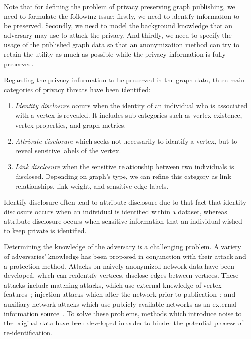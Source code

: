 Note that for defining the problem of privacy preserving graph publishing, we need to formulate the following issue: firstly, we need to identify information to be preserved. Secondly, we need to model the background knowledge that an adversary may use to attack the privacy. And thirdly, we need to specify the usage of the published graph data so that an anonymization method can try to retain the utility as much as possible while the privacy information is fully preserved. 

Regarding the privacy information to be preserved in the graph data, three main categories of privacy threats have been identified: 
\begin{enumerate}
    \item {\em Identity disclosure} occurs when the identity of an individual who is associated with a vertex is revealed. It includes sub-categories such as vertex existence, vertex properties, and graph metrics. 
    \item {\em Attribute disclosure} which seeks not necessarily to identify a vertex, but to reveal sensitive labels of the vertex. 
    \item {\em Link disclosure} when the sensitive relationship between two individuals is disclosed. Depending on graph's type, we can refine this category as link relationships, link weight, and sensitive edge labels. 
\end{enumerate}

Identify disclosure often lead to attribute disclosure due to that fact that identity disclosure occurs when an individual is identified within a dataset, whereas attribute disclosure occurs when sensitive information that an individual wished to keep private is identified. 

Determining the knowledge of the adversary is a challenging problem. A variety of adversaries' knowledge has been proposed in conjunction with their attack and a protection method. Attacks on naively anonymized network data have been developed, which can reidentify vertices, disclose edges between vertices. These attacks include matching attacks, which use external knowledge of vertex features~\cite{Liu_Towards_2008,Wu_k_2010,Boldi_Injecting_2012,Zhou_Preserving_2008}; injection attacks which alter the network prior to publication~\cite{Backstrom2011}; and auxiliary network attacks which use publicly available networks as an external information source~\cite{Narayanan2009}. To solve these problems, methods which introduce noise to the original data have been developed in order to hinder the potential process of re-identification. 

